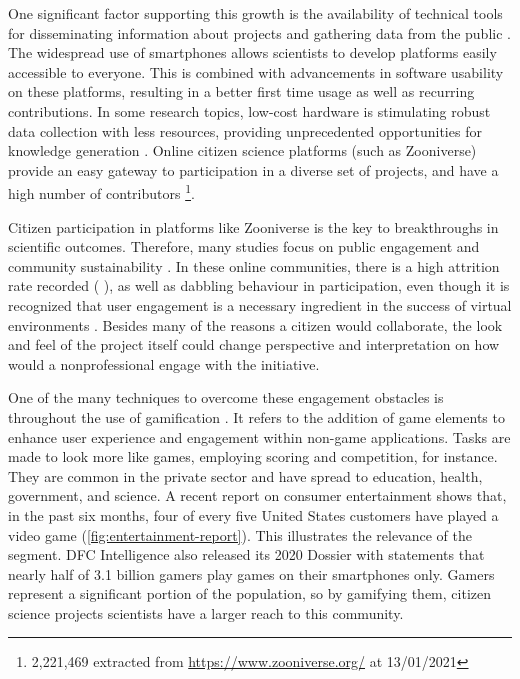 One significant factor supporting this growth is the availability of technical tools for disseminating information about projects and gathering data from the public \cite{silvertown2009new}. The widespread use of smartphones allows scientists to develop platforms easily accessible to everyone. This is combined with advancements in software usability on these platforms, resulting in a better first time usage as well as recurring contributions. In some research topics, low-cost hardware is stimulating robust data collection with less resources, providing unprecedented opportunities for knowledge generation \cite{buytaert2014citizen}. Online citizen science platforms (such as Zooniverse) provide an easy gateway to participation in a diverse set of projects, and have a high number of contributors \footnote{2,221,469 extracted from \url{https://www.zooniverse.org/} at 13/01/2021}.

Citizen participation in platforms like Zooniverse is the key to breakthroughs in scientific outcomes. Therefore, many studies focus on public engagement and community sustainability \cite{aristeidou2017profiles}. In these online communities, there is a high attrition rate recorded (\cite{nov2011technology} \cite{ponciano2015finding}), as well as dabbling behaviour \cite{eveleigh2014designing} in participation, even though it is recognized that user engagement is a necessary ingredient in the success of virtual environments \cite{verhagen2015benefitting}. Besides many of the reasons a citizen would collaborate, the look and feel of the project itself could change perspective and interpretation on how would a nonprofessional engage with the initiative.

One of the many techniques to overcome these engagement obstacles is throughout the use of gamification \cite{bowser2013using}. It refers to the addition of game elements to enhance user experience and engagement within non-game applications. Tasks are made to look more like games, employing scoring and competition, for instance. They are common in the private sector and have spread to education, health, government, and science. A recent report on consumer entertainment shows that, in the past six months, four of every five United States customers have played a video game (\autoref{fig:entertainment-report}). This illustrates the relevance of the segment. DFC Intelligence also released its 2020 Dossier with statements that nearly half of 3.1 billion gamers play games on their smartphones only. Gamers represent a significant portion of the population, so by gamifying them, citizen science projects scientists have a larger reach to this community.

